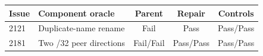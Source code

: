 \begin{tabular}{llccc}
\toprule
Issue & Component oracle & Parent & Repair & Controls \\
\midrule
2121 & Duplicate-name rename & Fail & Pass & Pass/Pass \\
2181 & Two /32 peer directions & Fail/Fail & Pass/Pass & Pass/Pass \\
\bottomrule
\end{tabular}
